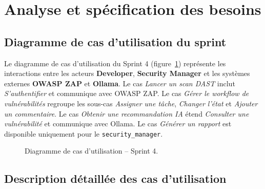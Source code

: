 \section{Analyse et spécification des besoins}

\subsection{Diagramme de cas d'utilisation du sprint}

Le diagramme de cas d'utilisation du Sprint 4 (figure~\ref{fig:sprint4-use-case}) représente les interactions entre les acteurs \textbf{Developer}, \textbf{Security Manager} et les systèmes externes \textbf{OWASP ZAP} et \textbf{Ollama}. Le cas \textit{Lancer un scan DAST} inclut \textit{S'authentifier} et communique avec OWASP ZAP. Le cas \textit{Gérer le workflow de vulnérabilités} regroupe les sous-cas \textit{Assigner une tâche}, \textit{Changer l'état} et \textit{Ajouter un commentaire}. Le cas \textit{Obtenir une recommandation IA} étend \textit{Consulter une vulnérabilité} et communique avec Ollama. Le cas \textit{Générer un rapport} est disponible uniquement pour le \texttt{security\_manager}.

\begin{figure}[H]
\centering
\fbox{\rule{0pt}{2in}\rule{0.9\linewidth}{0pt}}
\caption{Diagramme de cas d'utilisation -- Sprint 4.}
\label{fig:sprint4-use-case}
\end{figure}

\subsection{Description détaillée des cas d'utilisation}

